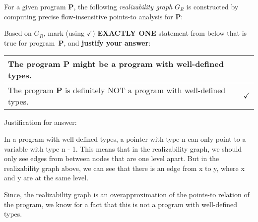 \documentclass[12pt]{article}
\begin{document}
\begin{enumerate}
      For a given program \textbf{P}, the following \emph{realizability graph}
      $G_R$ is constructed by computing precise flow-insensitive points-to
      analysis for \textbf{P}:
      \vspace{-2ex}
      \begin{center}
      \end{center}
      \vspace{-1ex}
        Based on $G_R$, mark (using $\checkmark$) \textbf{EXACTLY ONE} statement
        from below that is true for program~\textbf{P}, and \textbf{justify your
        answer}:
        \vspace{-2ex}
        \renewcommand{\arraystretch}{1.5}
        \begin{center}
        \begin{tabular}{|l|l|}
          \hline
          The program \textbf{P} might be a program with well-defined types. & \hspace{3em} \\ \hline
          The program \textbf{P} is definitely NOT a program with well-defined types. & $\checkmark$ \\ \hline 
        \end{tabular}
      \end{center}
      \vspace{-2ex}
       \begin{mdframed}
        Justification for answer:

        In a program with well-defined types, a pointer with type n can only point to a variable with type n - 1. This means that in the realizability graph, we should only see edges from between nodes that are one level apart. But in the realizability graph above, we can see that there is an edge from x to y, where x and y are at the same level.

        Since, the realizability graph is an overapproximation of the points-to relation of the program, we know for a fact that this is not a program with well-defined types.
       \end{mdframed}
    

    \end{enumerate}
    
\end{document}
